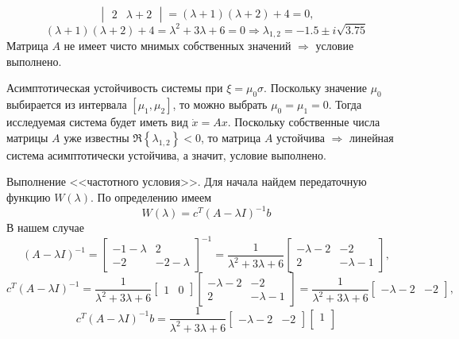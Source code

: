 \documentclass[a4paper, 12pt]{article}
\begin{document}
\begin{compactitem}
$$\begin{vmatrix}
            2 & \lambda+2
        \end{vmatrix}=
        (\lambda+1)(\lambda+2)+4=0,
        $$
        $$
        (\lambda+1)(\lambda+2)+4=\lambda^2+3\lambda+6=0\Rightarrow
        \lambda_{1,2}=-1.5\pm i\sqrt{3.75}
        $$
        Матрица $A$ не имеет чисто мнимых собственных значений $\Rightarrow$ условие выполнено.
        \item Асимптотическая устойчивость системы при $\xi=\mu_0\sigma$. Поскольку значение
        $\mu_0$ выбирается из интервала $\left[\mu_1,\mu_2\right]$, то можно выбрать
        $\mu_0=\mu_1=0$. Тогда исследуемая система будет иметь вид $\dot{x}=Ax$.
        Поскольку собственные числа матрицы $A$ уже известны $\Re\left\{\lambda_{1,2}\right\}<0$,
        то матрица $A$ устойчива $\Rightarrow$ линейная система асимптотически устойчива, а значит,
        условие выполнено.
        \item Выполнение <<частотного условия>>. Для начала найдем передаточную функцию $W(\lambda)$.
        По определению имеем $$W(\lambda)=c^T(A-\lambda I)^{-1}b$$ В нашем случае
        $$(A-\lambda I)^{-1}=
        \begin{bmatrix}
            -1-\lambda & 2\\
            -2 & -2-\lambda
        \end{bmatrix}^{-1}=
        \dfrac{1}{\lambda^2+3\lambda+6}
        \begin{bmatrix}
            -\lambda-2 & -2\\
            2 & -\lambda-1
        \end{bmatrix},$$
        $$
        c^T(A-\lambda I)^{-1}=
        \dfrac{1}{\lambda^2+3\lambda+6}
        \begin{bmatrix}
            1 & 0
        \end{bmatrix}
        \begin{bmatrix}
            -\lambda-2 & -2\\
            2 & -\lambda-1
        \end{bmatrix}=
        \dfrac{1}{\lambda^2+3\lambda+6}
        \begin{bmatrix}
            -\lambda-2 & -2
        \end{bmatrix},
        $$
        $$
        c^T(A-\lambda I)^{-1}b=
        \dfrac{1}{\lambda^2+3\lambda+6}
        \begin{bmatrix}
            -\lambda-2 & -2
        \end{bmatrix}
        \begin{bmatrix}
            1\\

\end{bmatrix}$$
\end{compactitem}
\end{document}
